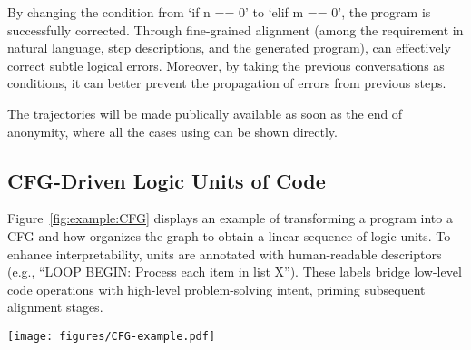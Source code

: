 
By changing the condition from `if n == 0' to `elif m == 0', the program is successfully corrected. Through fine-grained alignment (among the requirement in natural language, step descriptions, and the generated program), \tool can effectively correct subtle logical errors. Moreover, by taking the previous conversations as conditions, it can better prevent the propagation of errors from previous steps.

The trajectories will be made publically available as soon as the end of anonymity, where all the cases using \tool can be shown directly.


\subsection{CFG-Driven Logic Units of Code}\label{app:example:CFG}
Figure~\ref{fig:example:CFG} displays an example of transforming a program into a CFG and how \tool organizes the graph to obtain a linear sequence of logic units.
To enhance interpretability, units are annotated with human-readable descriptors (e.g., ``LOOP BEGIN: Process each item in list X''). These labels bridge low-level code operations with high-level problem-solving intent, priming subsequent alignment stages.

\begin{figure*}[htbp]
    \centering
    \vspace{-0.1in}
        {\texttt{[image: figures/CFG-example.pdf]}}
    \vspace{-0.1in}
    \caption{This figure depicts what a CFG looks like and how it is transformed into units. Nodes and edges in the CFG represent code blocks and control flow transitions, respectively. \tool divides the CFG into atomic logic units at key points, with each unit labeled for better understanding.}
    \vspace{-0.2in}
    \label{fig:example:CFG}
\end{figure*}


